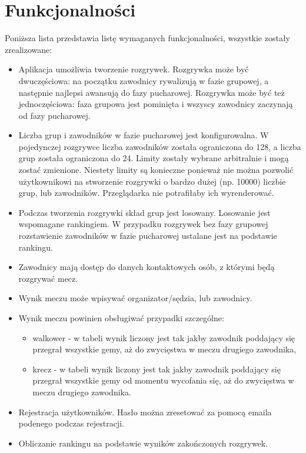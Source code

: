\documentclass[shortabstract]{iithesis}
\begin{document}
\section{Funkcjonalności}
Poniższa lista przedstawia listę wymaganych funkcjonalności, wszystkie zostały zrealizowane:
\begin{itemize}
    \item Aplikacja umożliwia tworzenie rozgrywek. Rozgrywka może być dwuczęściowa: na początku zawodnicy rywalizują w fazie grupowej, a następnie najlepsi awansują do fazy pucharowej.
    Rozgrywka może być też jednoczęściowa: faza grupowa jest pominięta i wszyscy zawodnicy zaczynają od fazy pucharowej.
    \item Liczba grup i zawodników w fazie pucharowej jest konfigurowalna.
          W pojedynczej rozgrywce liczba zawodników została ograniczona do 128, a liczba grup została ograniczona do 24.
          Limity zostały wybrane arbitralnie i mogą zostać zmienione.
          Niestety limity są konieczne ponieważ nie można pozwolić użytkownikowi na stworzenie rozgrywki o bardzo dużej (np. 10000) liczbie grup, lub zawodników.
          Przeglądarka nie potrafiłaby ich wyrenderować.
    \item Podczas tworzenia rozgrywki skład grup jest losowany. Losowanie jest wspomagane rankingiem.
          W przypadku rozgrywek bez fazy grupowej rozstawienie zawodników w fazie pucharowej ustalane jest na podstawie rankingu.
    \item Zawodnicy mają dostęp do danych kontaktowych osób, z którymi będą rozgrywać mecz.
    \item Wynik meczu może wpisywać organizator/sędzia, lub zawodnicy.
    \item Wynik meczu powinien obsługiwać przypadki szczególne:
          \begin{itemize}
              \item walkower - w tabeli wynik liczony jest tak jakby zawodnik poddający się przegrał wszystkie gemy, aż do zwycięstwa w meczu drugiego zawodnika,
              \item krecz - w tabeli wynik liczony jest tak jakby zawodnik poddający się przegrał wszystkie gemy od momentu wycofania się, aż do zwycięstwa w meczu drugiego zawodnika.
          \end{itemize}
    \item Rejestracja użytkowników. Hasło można zresetować za pomocą emaila podenego podczas rejestracji.
    \item Obliczanie rankingu na podstawie wyników zakończonych rozgrywek.
\end{itemize}
\end{document}
